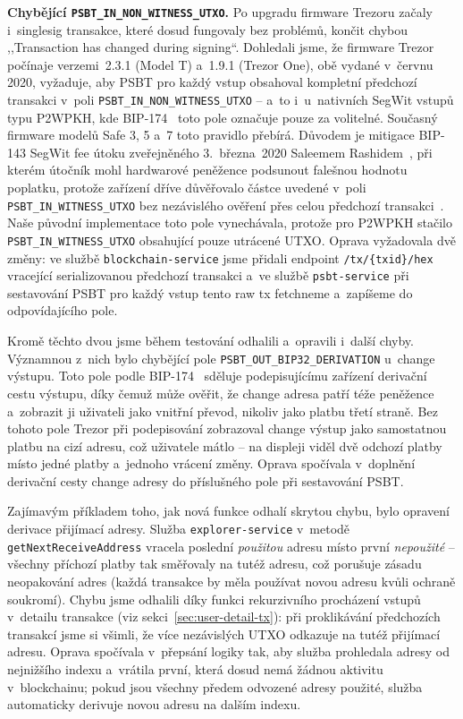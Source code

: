 \textbf{Chybějící \texttt{PSBT\_IN\_NON\_WITNESS\_UTXO}.}
Po upgradu firmware Trezoru začaly i~singlesig transakce, které dosud
fungovaly bez problémů, končit chybou ,,Transaction has changed during
signing``. Dohledali jsme, že firmware Trezor počínaje verzemi~2.3.1
(Model T) a~1.9.1 (Trezor One), obě vydané v~červnu 2020, vyžaduje,
aby PSBT pro každý vstup obsahoval kompletní předchozí transakci
v~poli \texttt{PSBT\_IN\_NON\_WITNESS\_UTXO} -- a~to i~u~nativních
SegWit vstupů typu P2WPKH, kde BIP-174~\cite{BIP174} toto pole
označuje pouze za volitelné. Současný firmware modelů Safe 3, 5
a~7 toto pravidlo přebírá. Důvodem je mitigace BIP-143 SegWit fee
útoku zveřejněného 3.~března~2020 Saleemem
Rashidem~\cite{TrezorSegwitFix2020}, při kterém útočník mohl
hardwarové peněžence podsunout falešnou hodnotu poplatku, protože
zařízení dříve důvěřovalo částce uvedené v~poli
\texttt{PSBT\_IN\_WITNESS\_UTXO} bez nezávislého ověření přes celou
předchozí transakci~\cite{TrezorFirmwareDocs}. Naše původní implementace
toto pole vynechávala, protože pro P2WPKH stačilo
\texttt{PSBT\_IN\_WITNESS\_UTXO} obsahující pouze utrácené UTXO.
Oprava vyžadovala dvě změny: ve službě \texttt{blockchain-service} jsme
přidali endpoint \texttt{/tx/\{txid\}/hex} vracející serializovanou
předchozí transakci a~ve službě \texttt{psbt-service} při sestavování PSBT
pro každý vstup tento raw tx fetchneme a~zapíšeme do odpovídajícího pole.

Kromě těchto dvou jsme během testování odhalili a~opravili i~další chyby.
Významnou z~nich bylo chybějící pole
\texttt{PSBT\_OUT\_BIP32\_DERIVATION} u~change výstupu. Toto pole podle
BIP-174~\cite{BIP174} sděluje podepisujícímu zařízení derivační cestu
výstupu, díky čemuž může ověřit, že change adresa patří téže peněžence
a~zobrazit ji uživateli jako vnitřní převod, nikoliv jako platbu třetí
straně. Bez tohoto pole Trezor při podepisování zobrazoval change výstup
jako samostatnou platbu na cizí adresu, což uživatele mátlo -- na displeji
viděl dvě odchozí platby místo jedné platby a~jednoho vrácení změny.
Oprava spočívala v~doplnění derivační cesty change adresy do příslušného
pole při sestavování PSBT.

Zajímavým příkladem toho, jak nová funkce odhalí skrytou chybu, bylo
opravení derivace přijímací adresy. Služba \texttt{explorer-\allowbreak service}
v~metodě \texttt{getNext\-Receive\-Address} vracela poslední \emph{použitou}
adresu místo první \emph{nepoužité} -- všechny příchozí platby tak směřovaly
na tutéž adresu, což porušuje zásadu neopakování adres (každá transakce
by měla používat novou adresu kvůli ochraně soukromí). Chybu jsme odhalili
díky funkci rekurzivního procházení vstupů v~detailu transakce
(viz sekci~\ref{sec:user-detail-tx}): při proklikávání předchozích transakcí
jsme si všimli, že více nezávislých UTXO odkazuje na tutéž přijímací adresu.
Oprava spočívala v~přepsání logiky tak, aby služba prohledala adresy od
nejnižšího indexu a~vrátila první, která dosud nemá žádnou aktivitu
v~blockchainu; pokud jsou všechny předem odvozené adresy použité, služba
automaticky derivuje novou adresu na dalším indexu.

